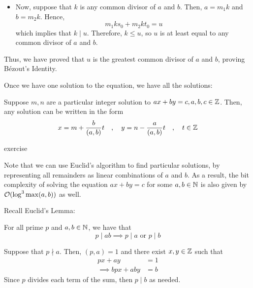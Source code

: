 \documentclass{article}
\begin{document}
\begin{pf}[source=Primary Source Material]
\begin{itemize}
        \item Now, suppose that $ k $ is any common divisor of $ a $ and $ b $.
            Then, $ a = m_{1}k $ and $ b = m_{2}k $. Hence,
            \begin{equation*}
                m_{1}ks_{0} + m_{2}kt_{0} = u
            \end{equation*}
            which implies that $ k \mid u $. Therefore, $ k \leq u $, so $ u $ is at least equal to any common divisor of $ a $ and $ b $.
    \end{itemize}
    Thus, we have proved that $ u $ is the greatest common divisor of $ a $ and $ b $, proving B\'ezout's Identity.

\end{pf}

\newpage
Once we have one solution to the equation, we have all the solutions:

\begin{thm}
    Suppose $ m, n $ are a particular integer solution to $ ax + by = c, a, b, c \in \mathbb{Z} $.
    Then, any solution can be written in the form
    \begin{equation*}
        x = m + \dfrac{b}{(a, b)}t \quad , \quad y = n - \dfrac{a}{(a, b)}t \quad , \quad t \in \mathbb{Z}
    \end{equation*}
\end{thm}

\begin{pf}
    exercise
\end{pf}

Note that we can use Euclid's algorithm to find particular solutions, by
representing all remainders as linear combinations of $ a $ and $ b $.
As a result, the bit complexity of solving the equation $ ax + by = c $ for some $ a, b \in \mathbb{N} $
is also given by $ \mathcal{O}(\log^{3}\max(a, b)) $ as well.


Recall Euclid's Lemma:

\begin{lm}
    For all prime $ p $ and $ a, b \in \mathbb{N} $, we have that
    \begin{equation*}
        p \mid ab \implies p \mid a \textrm{ or } p \mid b
    \end{equation*}
\end{lm}

\begin{pf}[source=Primary Source Material]
    Suppose that $ p \nmid a $. Then, $ (p, a) = 1 $ and there exist $ x, y \in \mathbb{Z} $ such that
    \begin{align*}
        px + ay & = 1 \\
        \implies bpx + aby & = b
    \end{align*}
    Since $ p $ divides each term of the sum, then $ p \mid b $ as needed.
\end{pf}
\end{document}
